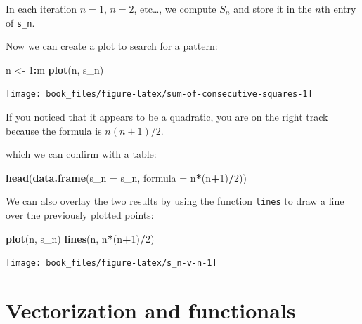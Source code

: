 \documentclass[
]{krantz}
\newenvironment{Shaded}{\begin{snugshade}}{\end{snugshade}}
\newcommand{\DataTypeTok}[1]{\textcolor[rgb]{0.27,0.27,0.27}{#1}}
\newcommand{\DecValTok}[1]{\textcolor[rgb]{0.06,0.06,0.06}{#1}}
\newcommand{\KeywordTok}[1]{\textcolor[rgb]{0.27,0.27,0.27}{\textbf{#1}}}
\newcommand{\NormalTok}[1]{#1}
\newcommand{\OperatorTok}[1]{\textcolor[rgb]{0.43,0.43,0.43}{\textbf{#1}}}
\newcommand{\StringTok}[1]{\textcolor[rgb]{0.5,0.5,0.5}{#1}}
\begin{document}
In each iteration \(n=1\), \(n=2\), etc\ldots, we compute \(S_n\) and store it in the \(n\)th entry of \texttt{s\_n}.

Now we can create a plot to search for a pattern:

\begin{Shaded}
\begin{Highlighting}[]
\NormalTok{n <-}\StringTok{ }\DecValTok{1}\OperatorTok{:}\NormalTok{m}
\KeywordTok{plot}\NormalTok{(n, s_n)}
\end{Highlighting}
\end{Shaded}

\begin{center}\texttt{[image: book\_files/figure-latex/sum-of-consecutive-squares-1]} \end{center}

If you noticed that it appears to be a quadratic, you are on the right track because the formula is \(n(n+1)/2\).

which we can confirm with a table:

\begin{Shaded}
\begin{Highlighting}[]
\KeywordTok{head}\NormalTok{(}\KeywordTok{data.frame}\NormalTok{(}\DataTypeTok{s_n =}\NormalTok{ s_n, }\DataTypeTok{formula =}\NormalTok{ n}\OperatorTok{*}\NormalTok{(n}\OperatorTok{+}\DecValTok{1}\NormalTok{)}\OperatorTok{/}\DecValTok{2}\NormalTok{))}
\end{Highlighting}
\end{Shaded}

We can also overlay the two results by using the function \texttt{lines} to draw a line over the previously plotted points:

\begin{Shaded}
\begin{Highlighting}[]
\KeywordTok{plot}\NormalTok{(n, s_n)}
\KeywordTok{lines}\NormalTok{(n, n}\OperatorTok{*}\NormalTok{(n}\OperatorTok{+}\DecValTok{1}\NormalTok{)}\OperatorTok{/}\DecValTok{2}\NormalTok{)}
\end{Highlighting}
\end{Shaded}

\begin{center}\texttt{[image: book\_files/figure-latex/s\_n-v-n-1]} \end{center}

\hypertarget{vectorization}{%
\section{Vectorization and functionals}\label{vectorization}}
\end{document}
